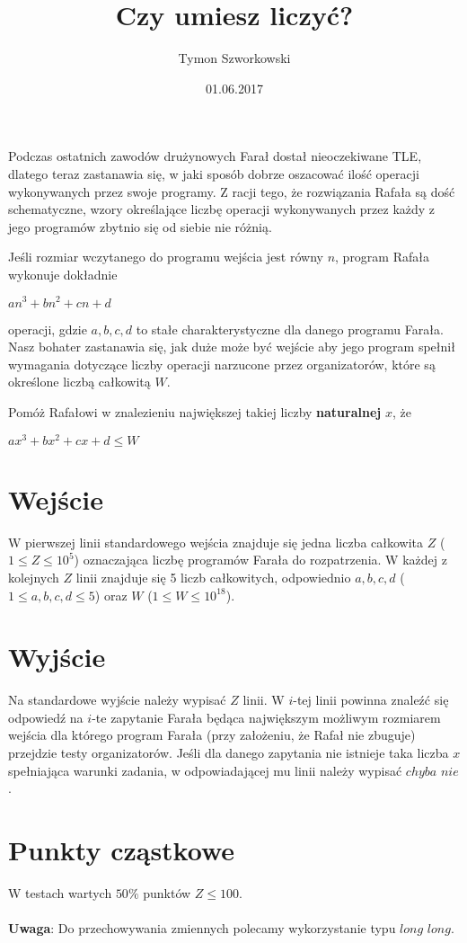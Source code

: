 \documentclass[zad,zawodnik,utf8]{sinol}
\title{Czy umiesz liczyć?}
\author{Tymon Szworkowski} %
\date{01.06.2017}
\begin{document}
\begin{tasktext}

Podczas ostatnich zawodów drużynowych Farał dostał nieoczekiwane TLE, dlatego teraz zastanawia się, w jaki sposób dobrze oszacować ilość operacji wykonywanych przez swoje programy. Z racji tego, że rozwiązania Rafała są dość schematyczne, wzory określające liczbę operacji wykonywanych przez każdy z jego programów zbytnio się od siebie nie różnią.

Jeśli rozmiar wczytanego do programu wejścia jest równy $n$, program Rafała wykonuje dokładnie
\begingroup
    \fontsize{13pt}{12pt}\selectfont
	\begin{center}
	$an^3 + bn^2 + cn + d$ 
	\end{center}
\endgroup	
operacji, gdzie $a, b, c, d$ to stałe charakterystyczne dla danego programu Farała. Nasz bohater zastanawia się, jak duże może być wejście aby jego program spełnił wymagania dotyczące liczby operacji narzucone przez organizatorów, które są określone liczbą całkowitą $W$.

Pomóż Rafałowi w znalezieniu największej takiej liczby \textbf{naturalnej} $x$, że
\begingroup
    \fontsize{13pt}{12pt}\selectfont
	\begin{center}
	$ax^3 + bx^2 + cx + d \leq W$ 
	\end{center}
\endgroup	

\section{Wejście}

W pierwszej linii standardowego wejścia znajduje się jedna liczba całkowita $Z$ ($1 \leq Z \leq 10^5$) oznaczająca liczbę programów Farała do rozpatrzenia.  W każdej z kolejnych $Z$ linii znajduje się 5 liczb całkowitych, odpowiednio $a, b, c, d$ ($1 \leq a, b, c, d \leq 5$) oraz $W$ ($1 \leq W \leq 10^{18}$).

\section{Wyjście}
Na standardowe wyjście należy wypisać $Z$ linii. W $i$-tej linii powinna znaleźć się odpowiedź na $i$-te zapytanie Farała będąca największym możliwym rozmiarem wejścia dla którego program Farała (przy założeniu, że Rafał nie zbuguje) przejdzie testy organizatorów. Jeśli dla danego zapytania nie istnieje taka liczba $x$ spełniająca warunki zadania, w odpowiadającej mu linii należy wypisać $chyba$ $nie$.
	\makecompactexample
	
\section{Punkty cząstkowe}
W testach wartych $50\%$ punktów $Z \leq 100$.
\\
\\
\textbf{Uwaga}: Do przechowywania zmiennych polecamy wykorzystanie typu $long$ $long$.

\end{tasktext}
\end{document}
